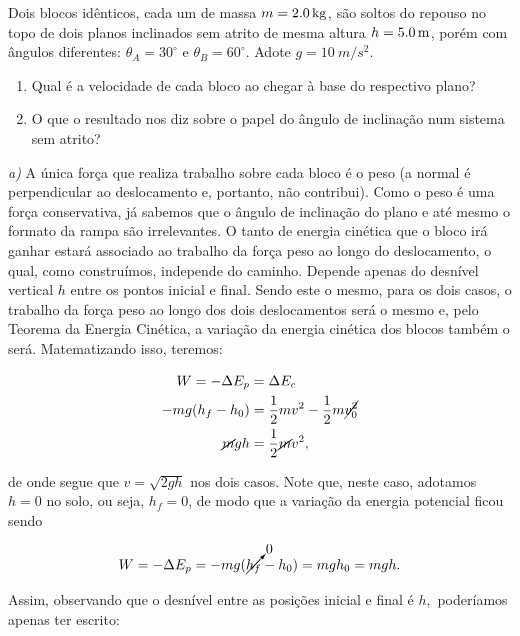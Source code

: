 \begin{exemplo}[Nível II]\label{exemplo_energia_potencialgravitacionalex02}

Dois blocos idênticos, cada um de massa $m = \SI{2{,}0}{kg}$, são
soltos do repouso no topo de dois planos inclinados sem atrito de
mesma altura $h = \SI{5{,}0}{m}$, porém com ângulos diferentes:
$\theta_A = 30^\circ$ e $\theta_B = 60^\circ$. Adote $g = \SI{10}{m/s^2}$.

\begin{enumerate}
  \item  [a)]Qual é a velocidade de cada bloco ao chegar à base do
  respectivo plano?
  \item  [b)] O que o resultado nos diz sobre o papel do ângulo de
  inclinação num sistema sem atrito?
\end{enumerate}

\resolucao

\textit{a)} A única força que realiza trabalho sobre cada bloco é o peso (a normal
é perpendicular ao deslocamento e, portanto, não contribui). Como o peso é uma força conservativa, já sabemos que o ângulo de inclinação do plano e até mesmo o formato da rampa são irrelevantes. O tanto de energia cinética que o bloco irá ganhar estará associado ao trabalho da força peso ao longo do deslocamento, o qual, como construímos, independe do caminho. Depende apenas do desnível vertical $h$ entre os pontos inicial e final. Sendo este o mesmo, para os dois casos, o trabalho da força peso ao longo dos dois deslocamentos será o mesmo e, pelo Teorema da Energia Cinética, a variação da energia cinética dos blocos também o será. Matematizando isso, teremos:

\begin{align}
    W = - \Delta E_p &= \Delta E_c \nonumber \\
         -mg(h_f-h_0) &= \dfrac{1}{2}mv^2 - \dfrac{1}{2}m \cancel{v_0^2} \nonumber \\
        \cancel mgh &=  \dfrac{1}{2} \cancel mv^2, \nonumber
\end{align}
 
\noindent de onde segue que $v= \sqrt{2gh}$ nos dois casos. Note que, neste caso, adotamos $h=0$ no solo, ou seja, $h_f=0$, de modo que a variação da energia potencial ficou sendo 

$$ W = - \Delta E_p = -mg( \cancelto{0}{h_f}-h_0) = mgh_0 = mgh.$$ 

Assim, observando que o desnível entre as posições inicial e final é $h,$ poderíamos apenas ter escrito:


\end{exemplo}
